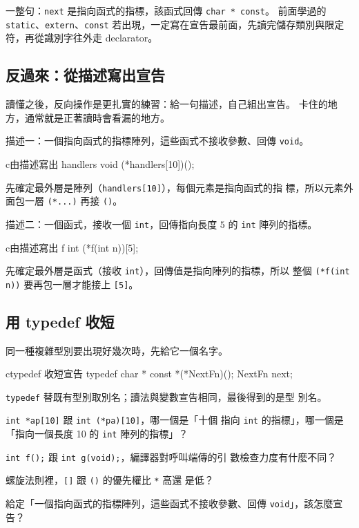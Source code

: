 一整句：\texttt{next} 是指向函式的指標，該函式回傳 \texttt{char *
const}。 前面學過的 \texttt{static}、\texttt{extern}、\texttt{const}
若出現，一定寫在宣告最前面，先讀完儲存類別與限定符，再從識別字往外走
declarator。

\subsection{反過來：從描述寫出宣告}

讀懂之後，反向操作是更扎實的練習：給一句描述，自己組出宣告。 卡住的地
方，通常就是正著讀時會看漏的地方。

描述一：一個指向函式的指標陣列，這些函式不接收參數、回傳
\texttt{void}。

\begin{code}{c}{由描述寫出 handlers}
void (*handlers[10])();
\end{code}

先確定最外層是陣列（\texttt{handlers[10]}），每個元素是指向函式的指
標，所以元素外面包一層 \texttt{(*...)} 再接 \texttt{()}。

描述二：一個函式，接收一個 \texttt{int}，回傳指向長度 $5$ 的
\texttt{int} 陣列的指標。

\begin{code}{c}{由描述寫出 f}
int (*f(int n))[5];
\end{code}

先確定最外層是函式（接收 \texttt{int}），回傳值是指向陣列的指標，所以
整個 \texttt{(*f(int n))} 要再包一層才能接上 \texttt{[5]}。

\subsection{用 typedef 收短}

同一種複雜型別要出現好幾次時，先給它一個名字。

\begin{code}{c}{typedef 收短宣告}
typedef char * const *(*NextFn)();
NextFn next;
\end{code}

\texttt{typedef} 替既有型別取別名；讀法與變數宣告相同，最後得到的是型
別名。


\begin{drills}[label=drills:decl-complex-declarations]
\item \texttt{int *ap[10]} 跟 \texttt{int (*pa)[10]}，哪一個是「十個
指向 \texttt{int} 的指標」，哪一個是「指向一個長度 10 的 \texttt{int}
陣列的指標」？
\item \texttt{int f();} 跟 \texttt{int g(void);}，編譯器對呼叫端傳的引
數檢查力度有什麼不同？
\item 螺旋法則裡，\texttt{[]} 跟 \texttt{()} 的優先權比 \texttt{*} 高還
是低？
\item 給定「一個指向函式的指標陣列，這些函式不接收參數、回傳
\texttt{void}」，該怎麼宣告？
\end{drills}

